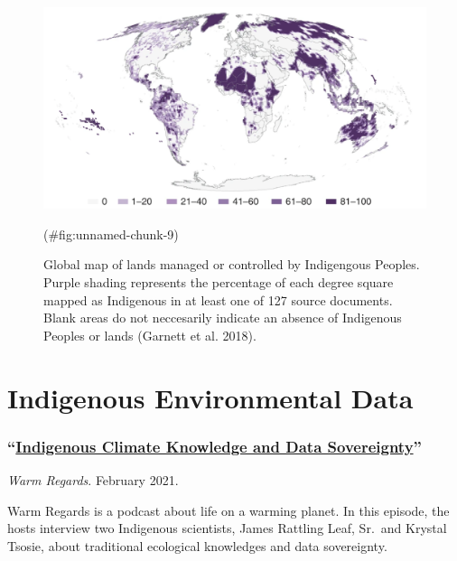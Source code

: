 \documentclass[
]{book}
\begin{document}
\begin{figure}
\includegraphics[width=30.92in]{images/Garnett_2018} \caption{Global map of lands managed or controlled by Indigengous Peoples. Purple shading represents the percentage of each degree square mapped as Indigenous in at least one of 127 source documents. Blank areas do not neccesarily indicate an absence of Indigenous Peoples or lands (Garnett et al. 2018).}(\#fig:unnamed-chunk-9)
\end{figure}

\hypertarget{indigenous-environmental-data}{%
\section{Indigenous Environmental Data}\label{indigenous-environmental-data}}

\hypertarget{indigenous-climate-knowledge-and-data-sovereignty}{%
\subsubsection*{\texorpdfstring{``\href{https://open.spotify.com/episode/4Gdp1RSChCPM0qftRun3DD?si=pcVeYiwwQIWnlKynt4-ADQ}{Indigenous Climate Knowledge and Data Sovereignty}''}{``Indigenous Climate Knowledge and Data Sovereignty''}}\label{indigenous-climate-knowledge-and-data-sovereignty}}

\emph{Warm Regards}. February 2021.

Warm Regards is a podcast about life on a warming planet. In this episode, the hosts interview two Indigenous scientists, James Rattling Leaf, Sr.~and Krystal Tsosie, about traditional ecological knowledges and data sovereignty.
\end{document}
